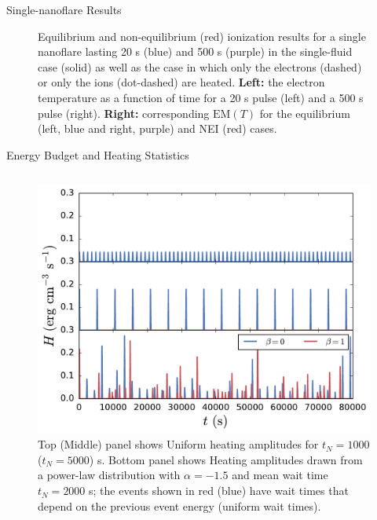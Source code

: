 \documentclass[final]{beamer}
\begin{document}
\begin{frame}
\begin{columns}[T]
\begin{column}{0.49\linewidth}
\begin{block}{Single-nanoflare Results}
\begin{figure}
{        \label{fig:single_em_dist}}
        \caption{Equilibrium and non-equilibrium (red) ionization results for a single nanoflare lasting 20 s (blue) and 500 s (purple) in the single-fluid case (solid) as well as the case in which only the electrons (dashed) or only the ions (dot-dashed) are heated. \textbf{Left:} the electron temperature as a function of time for a 20 s pulse (left) and a 500 s pulse (right). \textbf{Right:} corresponding $\mathrm{EM}(T)$ for the equilibrium (left, blue and right, purple) and NEI (red) cases.}
      \end{figure}
      \vspace{-2ex}
    \end{block}
    \begin{block}{Energy Budget and Heating Statistics}
      \begin{columns}[T]
      \begin{column}{0.49\columnwidth}
        \vspace{-2ex}
        \begin{figure}
          \includegraphics[width=\columnwidth]{figures/heating_functions.pdf}
          \caption{Top (Middle) panel shows Uniform heating amplitudes for $t_N=1000$ ($t_N=5000$) s. Bottom panel shows Heating amplitudes drawn from a power-law distribution with  $\alpha=-1.5$ and mean wait time $t_N=2000$ s; the events shown in red (blue) have wait times that depend on the previous event energy (uniform wait times).}
          \label{fig:heating_funcs}
        \end{figure}
      \end{column}

\end{columns}
\end{block}
\end{column}
\end{columns}
\end{frame}
\end{document}
